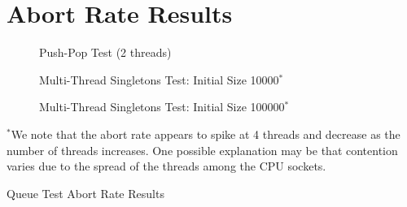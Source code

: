 \section{Abort Rate Results}
\label{app:queue_mt}

\begin{table}[H]
\begin{figure}[H]
    \centering
    
    \caption*{Push-Pop Test (2 threads)}
\end{figure}
\begin{figure}[H]
    \centering
        
    \caption*{Multi-Thread Singletons Test: Initial Size 10000$^*$}
\end{figure}
\begin{figure}[H]
    \centering
    
    \caption*{Multi-Thread Singletons Test: Initial Size 100000$^*$}
\end{figure}
    \caption*{\footnotesize{$^*$We note that the abort rate appears to spike at 4 threads and decrease as the number of threads increases. One possible explanation may be that contention varies due to the spread of the threads among the CPU sockets.}}
    \caption{Queue Test Abort Rate Results}
\end{table}
